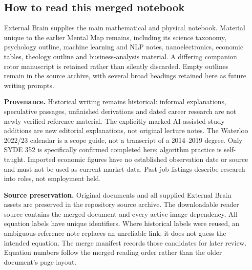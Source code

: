 \subsection{How to read this merged notebook}
External Brain supplies the main mathematical and physical notebook. Material unique to the earlier Mental Map remains, including its science taxonomy, psychology outline, machine learning and NLP notes, nanoelectronics, economic tables, theology outline and business-analysis material. A differing companion rotor manuscript is retained rather than silently discarded. Empty outlines remain in the source archive, with several broad headings retained here as future writing prompts.

\textbf{Provenance.} Historical writing remains historical: informal explanations, speculative passages, unfinished derivations and dated career research are not newly verified reference material. The explicitly marked AI-assisted study additions are new editorial explanations, not original lecture notes. The Waterloo 2022/23 calendar is a scope guide, not a transcript of a 2014--2019 degree. Only SYDE 352 is specifically confirmed completed here; algorithm practice is self-taught. Imported economic figures have no established observation date or source and must not be used as current market data. Past job listings describe research into roles, not employment held.

\textbf{Source preservation.} Original documents and all supplied External Brain assets are preserved in the repository source archive. The downloadable reader source contains the merged document and every active image dependency. All equation labels have unique identifiers. Where historical labels were reused, an ambiguous-reference note replaces an unreliable link; it does not guess the intended equation. The merge manifest records those candidates for later review. Equation numbers follow the merged reading order rather than the older document's page layout.


